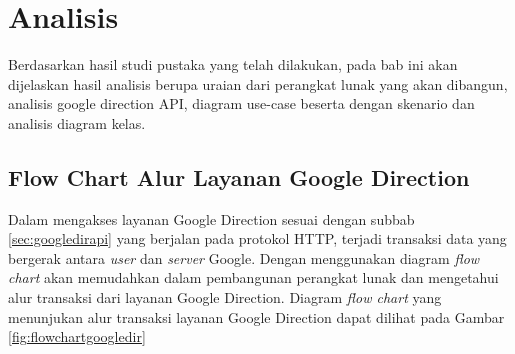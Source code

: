 \chapter{Analisis}
\label{chap:analisis}

Berdasarkan hasil studi pustaka yang telah dilakukan, pada bab ini akan dijelaskan hasil analisis berupa uraian dari perangkat lunak yang akan dibangun, analisis google direction API, diagram use-case beserta dengan skenario dan analisis diagram kelas.

\section{Flow Chart Alur Layanan Google Direction}
\label{sec:flowchartgoogledir}

Dalam mengakses layanan Google Direction sesuai dengan subbab \ref{sec:googledirapi} yang berjalan pada protokol HTTP, terjadi transaksi data yang bergerak antara \textit{user} dan \textit{server} Google. 
Dengan menggunakan diagram \textit{flow chart} akan memudahkan dalam pembangunan perangkat lunak dan mengetahui alur transaksi dari layanan Google Direction. Diagram \textit{flow chart} yang menunjukan alur transaksi layanan Google Direction dapat dilihat pada Gambar \ref{fig:flowchartgoogledir}

